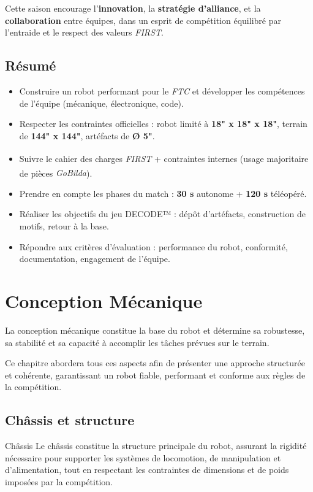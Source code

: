 \documentclass[12pt, a4paper]{report}
\newcommand{\registeredcompany}[1]{\textit{#1\textsuperscript{\tiny\textregistered}}}
\begin{document}
    Cette saison encourage l'\textbf{innovation}, la \textbf{stratégie d'alliance}, et la \textbf{collaboration} entre équipes, dans un esprit de compétition équilibré par l'entraide et le respect des valeurs \textit{FIRST}.


    \section{Résumé}
    \begin{itemize}
        \item Construire un robot performant pour le \textit{FTC} et développer les compétences de l’équipe (mécanique, électronique, code).
        \item Respecter les contraintes officielles : robot limité à \textbf{18" x 18" x 18"}, terrain de \textbf{144" x 144"}, artéfacts de \textbf{Ø 5"}.
        \item Suivre le cahier des charges \registeredcompany{FIRST} + contraintes internes (usage majoritaire de pièces \registeredcompany{GoBilda}).
        \item Prendre en compte les phases du match : \textbf{30 s} autonome + \textbf{120 s} téléopéré.
        \item Réaliser les objectifs du jeu DECODE™ : dépôt d’artéfacts, construction de motifs, retour à la base.
        \item Répondre aux critères d’évaluation : performance du robot, conformité, documentation, engagement de l’équipe.
    \end{itemize}


    \chapter{Conception Mécanique}

    La conception mécanique constitue la base du robot et détermine sa robustesse, sa stabilité et sa capacité à accomplir les tâches prévues sur le terrain.

    Ce chapitre abordera tous ces aspects afin de présenter une approche structurée et cohérente, garantissant un robot fiable, performant et conforme aux règles de la compétition.


    \section{Châssis et structure}

    \begin{mydefinition}{Châssis}
        Le châssis constitue la structure principale du robot, assurant la rigidité nécessaire pour supporter les systèmes de locomotion, de manipulation et d'alimentation, tout en respectant les contraintes de dimensions et de poids imposées par la compétition.
    \end{mydefinition}
\end{document}
